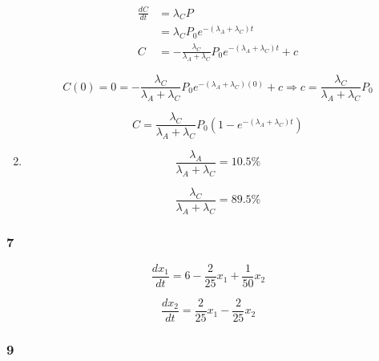 \documentclass{article}
\begin{document}
\begin{enumerate}
        \begin{align*}
          \frac{dC}{dt} & = \lambda_C P                                                                     \\
                        & = \lambda_C P_0 e^{-(\lambda_A + \lambda_C) t}                                    \\
          C             & = -\frac{\lambda_C}{\lambda_A + \lambda_C} P_0 e^{-(\lambda_A + \lambda_C) t} + c
        \end{align*}

        \[C(0) = 0 = -\frac{\lambda_C}{\lambda_A + \lambda_C} P_0 e^{-(\lambda_A + \lambda_C) (0)} + c \Rightarrow c = \frac{\lambda_C}{\lambda_A + \lambda_C} P_0\]

        \[C = \frac{\lambda_C}{\lambda_A + \lambda_C} P_0 (1 - e^{-(\lambda_A + \lambda_C) t})\]

  \item

        \[\frac{\lambda_A}{\lambda_A + \lambda_C} = 10.5\%\]

        \[\frac{\lambda_C}{\lambda_A + \lambda_C} = 89.5\%\]
\end{enumerate}

\subsubsection{7}

\[\frac{dx_1}{dt} = 6 - \frac{2}{25} x_1 + \frac{1}{50} x_2\]

\[\frac{dx_2}{dt} = \frac{2}{25} x_1 - \frac{2}{25} x_2\]

\subsubsection{9}
\end{document}
